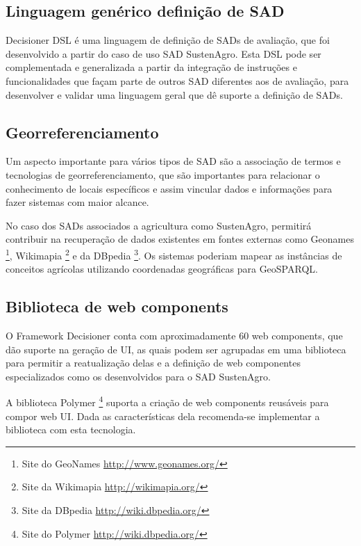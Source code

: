 \subsection*{Linguagem genérico definição de SAD}

Decisioner DSL é uma linguagem de definição de SADs de avaliação,
que foi desenvolvido a partir do caso de uso SAD SustenAgro. Esta
DSL pode ser complementada e generalizada a partir da integração de
instruções e funcionalidades que façam parte de outros SAD diferentes
aos de avaliação, para desenvolver e validar uma linguagem geral que
dê suporte a definição de SADs.

\subsection*{Georreferenciamento}

Um aspecto importante para vários tipos de SAD são a associação de
termos e tecnologias de georreferenciamento, que são importantes para
relacionar o conhecimento de locais específicos e assim vincular dados
e informações para fazer sistemas com maior alcance.

No caso dos SADs associados a agricultura como SustenAgro, permitirá
contribuir na recuperação de dados existentes em fontes externas como
\foreignlanguage{english}{Geonames} \footnote{Site do GeoNames \url{http://www.geonames.org/}},
\foreignlanguage{english}{Wikimapia} \footnote{Site da Wikimapia \url{http://wikimapia.org/}}
e da \foreignlanguage{english}{DBpedia} \footnote{Site da \foreignlanguage{english}{DBpedia} \url{http://wiki.dbpedia.org/}}.
Os sistemas poderiam mapear as instâncias de conceitos agrícolas utilizando
coordenadas geográficas para \foreignlanguage{english}{GeoSPARQL}.

\subsection*{Biblioteca de \foreignlanguage{english}{web components}}

O Framework Decisioner conta com aproximadamente 60 \foreignlanguage{english}{web
components}, que dão suporte na geração de UI, as quais podem ser
agrupadas em uma biblioteca para permitir a reatualização delas e
a definição de web componentes especializados como os desenvolvidos
para o SAD SustenAgro.

A biblioteca \foreignlanguage{english}{Polymer} \footnote{Site do \foreignlanguage{english}{Polymer} \url{http://wiki.dbpedia.org/}}
suporta a criação de \foreignlanguage{english}{web components} reusáveis
para compor web UI. Dada as características dela recomenda-se implementar
a biblioteca com esta tecnologia. 

